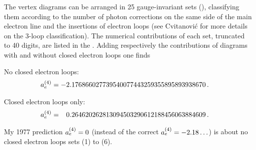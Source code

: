 \begin{description}
The vertex diagrams can be arranged in 25
gauge-invariant sets (),
classifying them according to the number of photon corrections on the
same side of the main electron line and the insertions of electron loops (see
Cvitanovi\'c for more details on the 3-loop classification).
The numerical contributions of each set, truncated to 40 digits, are
listed in the .
Adding respectively the contributions of diagrams with and without
closed electron loops one finds

No closed electron loops:
\begin{align}
 a_e^{(4)}&= -2.176866027739540077443259355895893938670 \,.
\end{align}

Closed electron loops only:
\begin{align}
 a_e^{(4)}&=  \phantom{+}0.264620262813094503290612188456063884609 \,.
\end{align}

My 1977 prediction $a_e^{(4)} = 0$
(instead of the correct $a_e^{(4)}= -2.18\ldots$) is about no closed
electron loops sets (1) to (6).


\end{description}
